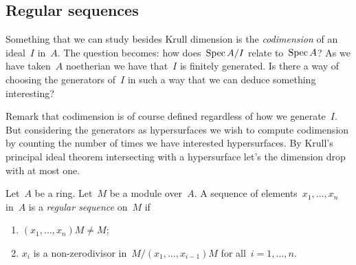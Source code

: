 \documentclass[10pt,a4paper]{article}
\begin{document}
\subsection{Regular sequences}
Something that we can study besides Krull dimension is the \emph{codimension} of an ideal~$I$ in~$A$. The question becomes: how does~$\operatorname{Spec} A/I$ relate to~$\operatorname{Spec} A$? As we have taken~$A$ noetherian we have that~$I$ is finitely generated. Is there a way of choosing the generators of~$I$ in such a way that we can deduce something interesting?

Remark that codimension is of course defined regardless of how we generate~$I$. But considering the generators as hypersurfaces we wish to compute codimension by counting the number of times we have interested hypersurfaces. By Krull's principal ideal theorem intersecting with a hypersurface let's the dimension drop with at most one.
\begin{definition}
  Let~$A$ be a ring. Let~$M$ be a module over~$A$. A sequence of elements~$x_1,\dotsc,x_n$ in~$A$ is a \emph{regular sequence} on~$M$ if
  \begin{enumerate}
    \item $(x_1,\dotsc,x_n)M\neq M$;
    \item $x_i$ is a non-zerodivisor in~$M/(x_1,\dotsc,x_{i-1})M$ for all~$i=1,\dotsc,n$.
  \end{enumerate}
\end{definition}
\end{document}
